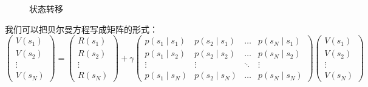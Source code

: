 \begin{figure}[htb]
  \centering
  \caption{状态转移}
  \label{fig:fig2.13}
\end{figure}

我们可以把贝尔曼方程写成矩阵的形式：
\begin{equation}
  \left(\begin{array}{c}
    V\left(s_{1}\right) \\
    V\left(s_{2}\right) \\
    \vdots \\
    V\left(s_{N}\right)
    \end{array}\right)=\left(\begin{array}{c}
    R\left(s_{1}\right) \\
    R\left(s_{2}\right) \\
    \vdots \\
    R\left(s_{N}\right)
    \end{array}\right)+\gamma\left(\begin{array}{cccc}
    p\left(s_{1} \mid s_{1}\right) & p\left(s_{2} \mid s_{1}\right) & \ldots & p\left(s_{N} \mid s_{1}\right) \\
    p\left(s_{1} \mid s_{2}\right) & p\left(s_{2} \mid s_{2}\right) & \ldots & p\left(s_{N} \mid s_{2}\right) \\
    \vdots & \vdots & \ddots & \vdots \\
    p\left(s_{1} \mid s_{N}\right) & p\left(s_{2} \mid s_{N}\right) & \ldots & p\left(s_{N} \mid s_{N}\right)
    \end{array}\right)\left(\begin{array}{c}
    V\left(s_{1}\right) \\
    V\left(s_{2}\right) \\
    \vdots \\
    V\left(s_{N}\right)
    \end{array}\right)
  \label{eq:}
\end{equation}

